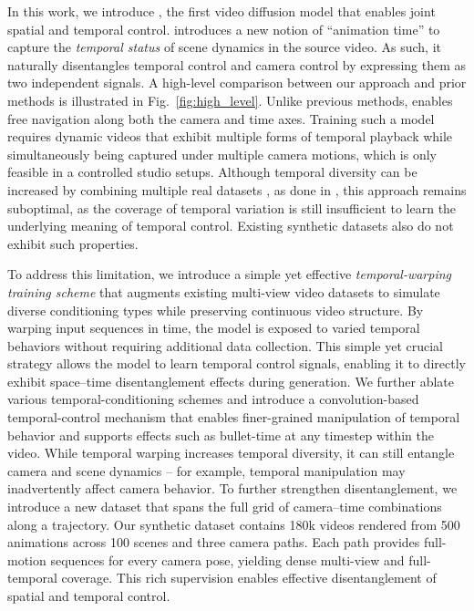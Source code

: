 
In this work, we introduce \textit{\nameMethod}, the first video diffusion model that enables joint spatial and temporal control. \nameMethod introduces a new notion of ``animation time'' to capture the \textit{temporal status} of scene dynamics in the source video. As such, it naturally disentangles temporal control and camera control by expressing them as two independent signals. 
A high-level comparison between our approach and prior methods is illustrated in Fig.~\ref{fig:high_level}. Unlike previous methods, \nameMethod enables free navigation along both the camera and time axes.
Training such a model requires dynamic videos that exhibit multiple forms of temporal playback while simultaneously being captured under multiple camera motions, which is only feasible in a controlled studio setups. 
Although temporal diversity can be increased by combining multiple real datasets \eg \cite{zhou2018stereo,ling2024dl3dv}, as done in \cite{watson2025controllingspacetimediffusion,Wu2024}, this approach remains suboptimal, as the coverage of temporal variation is still insufficient to learn the underlying meaning of temporal control.
Existing synthetic datasets \cite{Bai2025, bai2024syncammaster} also do not exhibit such properties.

To address this limitation, we introduce a simple yet effective \textit{temporal-warping training scheme} that augments existing multi-view video datasets \cite{Bai2025, bai2024syncammaster} to simulate diverse conditioning types while preserving continuous video structure. By warping input sequences in time, the model is exposed to varied temporal behaviors without requiring additional data collection. This simple yet crucial strategy allows the model to learn temporal control signals, enabling it to directly exhibit space–time disentanglement effects during generation.
We further ablate various temporal-conditioning schemes and introduce a convolution-based temporal-control mechanism that enables finer-grained manipulation of temporal behavior and supports effects such as bullet-time at any timestep within the video.
While temporal warping increases temporal diversity, it can still entangle camera and scene dynamics -- for example, temporal manipulation may inadvertently affect camera behavior. 
To further strengthen disentanglement, we introduce a new dataset that spans the full grid of camera–time combinations along a trajectory. Our synthetic \textit{\nameDataset} dataset contains 180k videos rendered from 500 animations across 100 scenes and three camera paths. Each path provides full-motion sequences for every camera pose, yielding dense multi-view and full-temporal coverage. This rich supervision enables effective disentanglement of spatial and temporal control.


